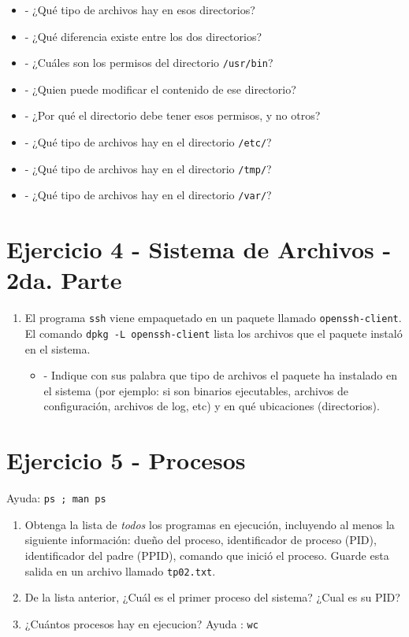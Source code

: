 \documentclass[12pt]{article}
\begin{document}
\begin{itemize}
\item - ¿Qué tipo de archivos hay en esos directorios?
\item - ¿Qué diferencia existe entre los dos directorios?
\item - ¿Cuáles son los permisos del directorio \texttt{/usr/bin}?
\item - ¿Quien puede modificar el contenido de ese directorio?
\item - ¿Por qué el directorio debe tener esos permisos, y no otros?
\end{itemize}

\begin{itemize}
\item - ¿Qué tipo de archivos hay en el directorio \texttt{/etc/}?

\item - ¿Qué tipo de archivos hay en el directorio \texttt{/tmp/}?

\item - ¿Qué tipo de archivos hay en el directorio \texttt{/var/}?
\end{itemize}

\section*{Ejercicio 4 - Sistema de Archivos - 2da. Parte}
\begin{enumerate}
\item El programa \texttt{ssh} viene empaquetado en un paquete llamado \texttt{openssh-client}.
El comando \texttt{dpkg -L openssh-client} lista los archivos que el paquete instaló en el sistema.
\begin{itemize}
\item - Indique con sus palabra que tipo de archivos el paquete ha instalado en el sistema (por ejemplo: si son binarios ejecutables, archivos de configuración, archivos de log, etc) y en qué ubicaciones (directorios).
\end{itemize}
\end{enumerate}

\section*{Ejercicio 5 - Procesos}
Ayuda: \texttt{ps ; man ps}
\begin{enumerate}
\item Obtenga la lista de \textit{todos} los programas en ejecución, incluyendo al menos la siguiente información:
dueño del proceso, identificador de proceso (PID), identificador del padre (PPID),
comando que inició el proceso. Guarde esta salida en un archivo llamado \texttt{tp02.txt}.
\item De la lista anterior, ¿Cuál es el primer proceso del sistema? ¿Cual es su PID?
\item ¿Cuántos procesos hay en ejecucion? Ayuda : \texttt{wc}
\end{enumerate}
\end{document}
